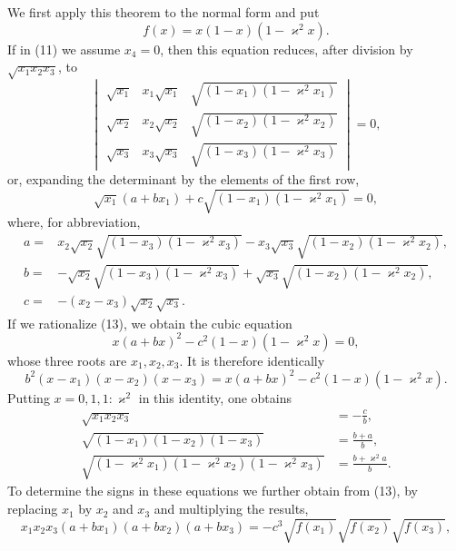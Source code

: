 \documentclass[11pt]{article}
\begin{document}
We first apply this theorem to the normal form and put
\[
f(x)=x(1-x)(1-\varkappa^2x).
\]
If in (11) we assume $x_4=0$, then this equation reduces, after division by $\sqrt{x_1x_2x_3}$, to
\begin{equation}
\begin{vmatrix}
\sqrt{x_1}&x_1\sqrt{x_1}&\sqrt{(1-x_1)(1-\varkappa^2x_1)}\\
\sqrt{x_2}&x_2\sqrt{x_2}&\sqrt{(1-x_2)(1-\varkappa^2x_2)}\\
\sqrt{x_3}&x_3\sqrt{x_3}&\sqrt{(1-x_3)(1-\varkappa^2x_3)}
\end{vmatrix}=0,
\tag{12}
\end{equation}
or, expanding the determinant by the elements of the first row,
\begin{equation}
\sqrt{x_1}(a+bx_1)+c\sqrt{(1-x_1)(1-\varkappa^2x_1)}=0,
\tag{13}
\end{equation}
where, for abbreviation,
\begin{equation}
\begin{aligned}
a={}&x_2\sqrt{x_2}\sqrt{(1-x_3)(1-\varkappa^2x_3)}
-x_3\sqrt{x_3}\sqrt{(1-x_2)(1-\varkappa^2x_2)},\\
b={}&-\sqrt{x_2}\sqrt{(1-x_3)(1-\varkappa^2x_3)}
+\sqrt{x_3}\sqrt{(1-x_2)(1-\varkappa^2x_2)},\\
c={}&-(x_2-x_3)\sqrt{x_2}\sqrt{x_3}.
\end{aligned}
\tag{14}
\end{equation}
If we rationalize (13), we obtain the cubic equation
\[
x(a+bx)^2-c^2(1-x)(1-\varkappa^2x)=0,
\]
whose three roots are $x_1,x_2,x_3$. It is therefore identically
\begin{equation}
b^2(x-x_1)(x-x_2)(x-x_3)
=
x(a+bx)^2-c^2(1-x)(1-\varkappa^2x).
\tag{15}
\end{equation}
Putting $x=0,1,1:\varkappa^2$ in this identity, one obtains
\begin{equation}
\begin{aligned}
\sqrt{x_1x_2x_3}&=-\frac cb,\\
\sqrt{(1-x_1)(1-x_2)(1-x_3)}&=\frac{b+a}{b},\\
\sqrt{(1-\varkappa^2x_1)(1-\varkappa^2x_2)(1-\varkappa^2x_3)}&=\frac{b+\varkappa^2a}{b}.
\end{aligned}
\tag{16}
\end{equation}
To determine the signs in these equations we further obtain from (13), by replacing $x_1$ by $x_2$ and $x_3$ and multiplying the results,
\[
x_1x_2x_3(a+bx_1)(a+bx_2)(a+bx_3)
=-c^3\sqrt{f(x_1)}\sqrt{f(x_2)}\sqrt{f(x_3)},
\]
\end{document}
